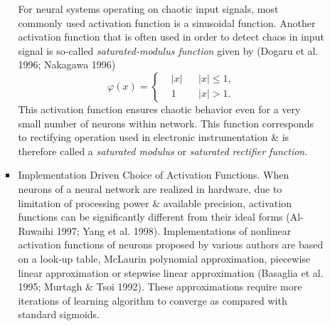 \documentclass{article}
\begin{document}
\begin{enumerate}
\begin{itemize}
\begin{itemize}
			For neural systems operating on chaotic input signals, most commonly used activation function is a sinusoidal function. Another activation function that is often used in order to detect chaos in input signal is so-called {\it saturated-modulus function} given by (Dogaru et al. 1996; Nakagawa 1996)
			\begin{equation}
				\varphi(x) = \left\{\begin{split}
					&|x|&&|x|\le 1,\\
					&1&&|x| > 1.
				\end{split}\right.
			\end{equation}
			This activation function ensures chaotic behavior even for a very small number of neurons within network. This function corresponds to rectifying operation used in electronic instrumentation \& is therefore called a {\it saturated modulus} or {\it saturated rectifier function}.
			\item {\sf Implementation Driven Choice of Activation Functions.} When neurons of a neural network are realized in hardware, due to limitation of processing power \& available precision, activation functions can be significantly different from their ideal forms (Al-Ruwaihi 1997; Yang et al. 1998). Implementations of nonlinear activation functions of neurons proposed by various authors are based on a look-up table, McLaurin polynomial approximation, piecewise linear approximation or stepwise linear approximation (Basaglia et al. 1995; Murtagh \& Tsoi 1992). These approximations require more iterations of learning algorithm to converge as compared with standard sigmoids.
			

\end{itemize}
\end{itemize}
\end{enumerate}
\end{document}
